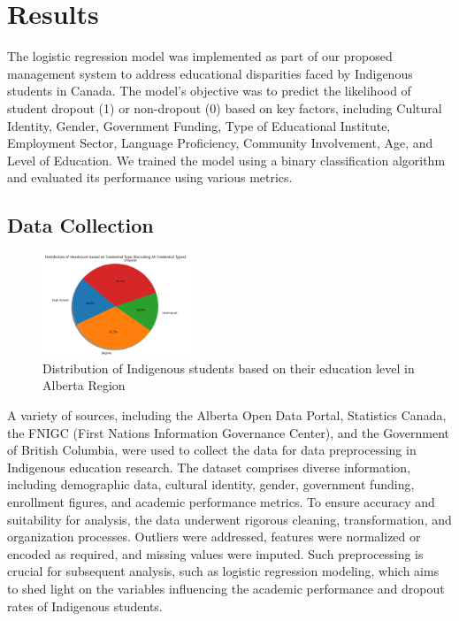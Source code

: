 \documentclass[final,12p,twocolumn]{article}
\begin{document}
\section{Results}

The logistic regression model was implemented as part of our proposed management system to address educational disparities faced by Indigenous students in Canada. The model's objective was to predict the likelihood of student dropout (1) or non-dropout (0) based on key factors, including Cultural Identity, Gender, Government Funding, Type of Educational Institute, Employment Sector, Language Proficiency, Community Involvement, Age, and Level of Education. We trained the model using a binary classification algorithm and evaluated its performance using various metrics.


\subsection{\textbf{Data Collection}}

\begin{figure}[H]
	\centering 
	\includegraphics[width=0.4\textwidth, angle=0]{images/DataCollection.png}	
	\caption{Distribution of Indigenous students based on their education level in Alberta Region} 
	\label{fig:datacollection}
\end{figure}

A variety of sources, including the Alberta Open Data Portal, Statistics Canada, the FNIGC (First Nations Information Governance Center), and the Government of British Columbia, were used to collect the data for data preprocessing in Indigenous education research. The dataset comprises diverse information, including demographic data, cultural identity, gender, government funding, enrollment figures, and academic performance metrics. To ensure accuracy and suitability for analysis, the data underwent rigorous cleaning, transformation, and organization processes. Outliers were addressed, features were normalized or encoded as required, and missing values were imputed. Such preprocessing is crucial for subsequent analysis, such as logistic regression modeling, which aims to shed light on the variables influencing the academic performance and dropout rates of Indigenous students.
\end{document}
